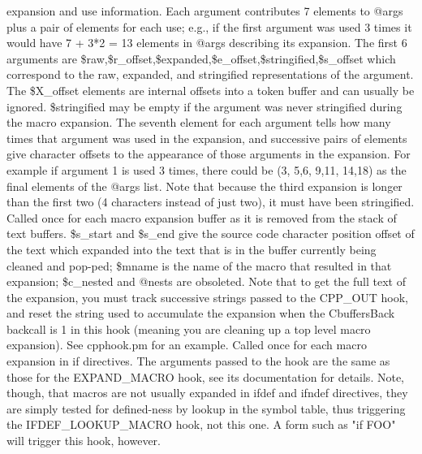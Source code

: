 expansion and use information.  Each argument contributes 7 elements to @args
plus a pair of elements for each use;  e.g., if the first argument was used 3 times
it would have 7 + 3*2 = 13 elements in @args describing its expansion.  The
first 6 arguments are \$raw,\$r\_\-offset,\$expanded,\$e\_\-offset,\$stringified,\$s\_\-offset
which correspond to the raw, expanded, and stringified representations of the
argument.  The \$X\_\-offset elements are internal offsets into a token buffer
and can usually be ignored.  \$stringified may be empty if the argument was
never stringified during the macro expansion.  The seventh element for each
argument tells how many times that argument was used in the expansion, and
successive pairs of elements give character offsets to the appearance of those
arguments in the expansion.  For example if argument 1 is used 3 times, there could
be (3, 5,6, 9,11,  14,18) as the final elements of the @args list.  Note that
because the third expansion is longer than the first two (4 characters instead of
just two), it must have been stringified.
Called once for each macro expansion buffer as it is removed 
from the stack of text buffers.  \$s\_\-start and \$s\_\-end give the source
code character position offset of the text which expanded into the text
that is in the buffer currently being cleaned and pop-ped;  \$mname is the
name of the macro that resulted in that expansion; \$c\_\-nested and @nests
are obsoleted.  Note that to get the full text of the expansion, you must
track successive strings passed to the CPP\_\-OUT hook, and reset the
string used to accumulate the expansion when the CbuffersBack backcall
is 1 in this hook (meaning you are cleaning up a top level macro expansion).
See cpphook.pm for an example.
Called once for each macro expansion in \pphash{}if directives.  The arguments
passed to the hook are the same as those for the EXPAND\_\-MACRO hook, see its
documentation for details.  Note, though, that macros are not usually
expanded in \pphash{}ifdef and \pphash{}ifndef directives, they are simply tested for
defined-ness by lookup in the symbol table, thus triggering the IFDEF\_\-LOOKUP\_\-MACRO
hook, not this one.  A form such as "\pphash{}if FOO" will trigger this hook, however.
